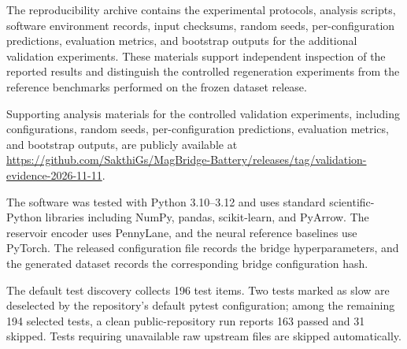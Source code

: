 \documentclass[11pt]{article}
\begin{document}
The reproducibility archive contains the experimental
protocols, analysis scripts, software environment records, input checksums, random seeds, per-configuration predictions, evaluation metrics, and bootstrap outputs for the additional validation experiments. These materials support independent
inspection of the reported results and distinguish the controlled regeneration experiments from the reference benchmarks performed on the frozen dataset release.


Supporting analysis materials for the controlled
validation experiments, including configurations,
random seeds, per-configuration predictions,
evaluation metrics, and bootstrap outputs, are
publicly available at
\url{https://github.com/SakthiGs/MagBridge-Battery/releases/tag/validation-evidence-2026-11-11}.

The software was tested with Python 3.10--3.12 and uses standard
scientific-Python libraries including NumPy, pandas, scikit-learn, and
PyArrow. The reservoir encoder uses PennyLane, and the neural reference
baselines use PyTorch. The released configuration file records the bridge
hyperparameters, and the generated dataset records the corresponding bridge
configuration hash.

The default test discovery collects 196 test items. Two tests marked as
slow are deselected by the repository's default pytest configuration;
among the remaining 194 selected tests, a clean public-repository run
reports 163 passed and 31 skipped. Tests requiring unavailable raw
upstream files are skipped automatically.
\end{document}
